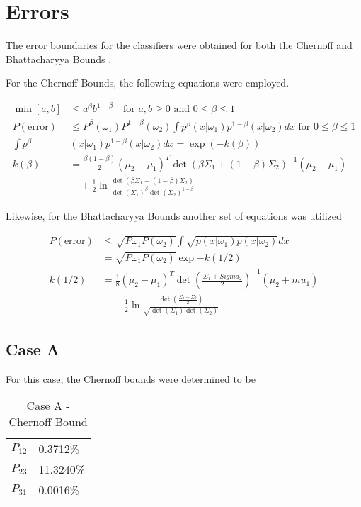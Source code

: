 \section{Errors}

The error boundaries for the classifiers were obtained
for both the Chernoff and Bhattacharyya Bounds \cite{duda2012pattern}.

For the Chernoff Bounds, the following equations were employed.

\begin{align*}
 \min[a,b] & \leq a^\beta b^{1-\beta}  \quad \text{for } a,b \geq 0 \text{ and } 0\leq \beta \leq 1  \\
 P(\text{error}) & \leq P^\beta (\omega_1) P^{1-\beta} (\omega_2) \int p^\beta (x | \omega_1)p^{1-\beta}(x|\omega_2)dx  \text{ for } 0 \leq \beta \leq 1\\
\int p^\beta &(x | \omega_1)p^{1-\beta}(x|\omega_2)dx  = \exp(-k(\beta)) \\
k(\beta) &= \frac{\beta(1-\beta)}{2} (\mu_2 - \mu_1)^T \det(\beta  \Sigma_1 + (1-\beta)\Sigma_2)^{-1} (\mu_2 - \mu_1) \\
& \quad + \frac{1}{2} \ln \frac{\det(\beta \Sigma_1  + (1-\beta)\Sigma_2)}{\det(\Sigma_1)^\beta \det(\Sigma_2)^{1-\beta}}
 \end{align*}

 Likewise, for the Bhattacharyya Bounds another set of equations was utilized

\begin{align*}
 P(\text{error}) & \leq \sqrt{P{\omega_1} P(\omega_2)} \int \sqrt{p(x | \omega_1) p(x|\omega_2)} dx\\
 &= \sqrt{P{\omega_1} P(\omega_2)} \exp{-k(1/2)}\\
 k(1/2) &= \frac{1}{8}(\mu_2 - \mu_1)^T \det(\frac{\Sigma_1 + Sigma_2}{2})^{-1} (\mu_2 + mu_1) \\
 & \quad + \frac{1}{2} \ln \frac{\det(\frac{\Sigma_1 + \Sigma_2}{2})}{\sqrt{\det(\Sigma_1)\det(\Sigma_2)}}
\end{align*}


\subsection{Case A}

For this case, the Chernoff bounds were determined to be

\begin{table}[htb]
\begin{center}
\begin{tabular}{ll}
$P_{12}$ & 0.3712\%\\
$P_{23}$ & 11.3240\%\\
$P_{31}$ & 0.0016\%
\end{tabular}
\end{center}
\caption{Case A - Chernoff Bound}
\label{tab: case a chernoff}
\end{table}

